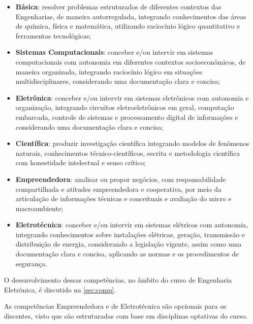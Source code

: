 \newcommand{\compBasica}{resolver problemas estruturados de diferentes contextos das Engenharias, de maneira autorregulada, integrando conhecimentos das áreas de química, física e matemática, utilizando raciocínio lógico quantitativo e ferramentas tecnológicas}

\newcommand{\compComp}{conceber e/ou intervir em sistemas computacionais com autonomia em diferentes contextos socioeconômicos, de maneira organizada, integrando raciocínio lógico em situações multidisciplinares, considerando uma documentação clara e concisa}

\newcommand{\compTron}{conceber e/ou intervir em sistemas eletrônicos com autonomia e organização, integrando circuitos eletroeletrônicos em geral, computação embarcada, controle de sistemas e processamento digital de informações e considerando uma documentação clara e concisa}

\newcommand{\compCien}{produzir investigação científica integrando modelos de fenômenos naturais, conhecimentos técnico-científicos, escrita e metodologia científica com honestidade intelectual e senso crítico}

\newcommand{\compEmp}{analisar ou propor negócios, com responsabilidade compartilhada e atitudes empreendedora e cooperativa, por meio da articulação de informações técnicas e conceituais e avaliação do micro e macroambiente}

\newcommand{\compEle}{conceber e/ou intervir em sistemas elétricos com autonomia, integrando conhecimentos sobre instalações elétricas, geração, transmissão e distribuição de energia, considerando a legislação vigente, assim como uma documentação clara e concisa, aplicando as normas e os procedimentos de segurança}

\begin{itemize}
	\item \textbf{Básica}: \compBasica;
	\item \textbf{Sistemas Computacionais}: \compComp;
	\item \textbf{Eletrônica}: \compTron;
	\item \textbf{Científica}: \compCien;
	\item \textbf{Empreendedora}: \compEmp;
	\item \textbf{Eletrotécnica}: \compEle.
\end{itemize}

O desenvolvimento dessas competências, no âmbito do curso de Engenharia Eletrônica, é discutido na \autoref{sec:comp}.

As competências Empreendedora e de Eletrotécnica são opcionais para os discentes, visto que são estruturadas com base em disciplinas optativas do curso.



